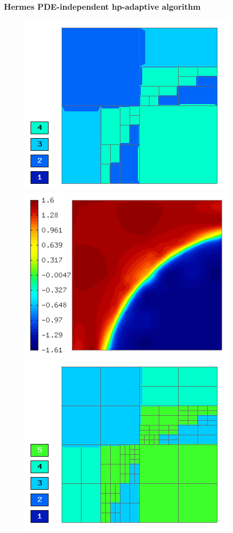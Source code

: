 \documentclass{beamer}
\begin{document}
\begin{frame}
\frametitle{Hermes PDE-independent hp-adaptive algorithm}
\begin{center}
\vspace{0.16mm}
\begin{figure}[t]
\includegraphics[width=0.42\textheight]{refsln/screen008.png}
\includegraphics[width=0.42\textheight]{refsln/screen007.png}
\includegraphics[width=0.42\textheight]{refsln/screen009.png}

\end{figure}
\end{center}
\end{frame}
\end{document}
